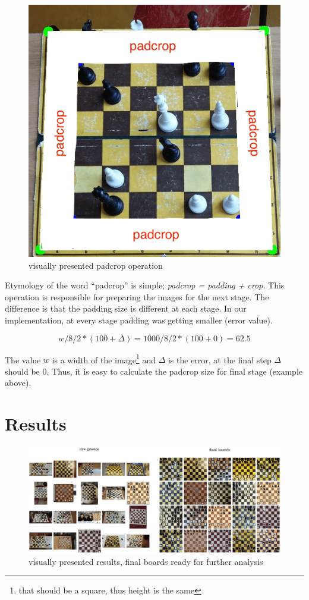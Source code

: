 \documentclass[letterpaper, 12pt]{article}
\begin{document}
\begin{figure}
\centering\vspace*{-0.6in}
\includegraphics[width=\columnwidth]{figure10}
\caption{visually presented padcrop operation}
\end{figure}

Etymology of the word ``padcrop'' is simple; \textit{padcrop = padding + crop}. This operation is responsible for preparing the images for the next stage.
The difference is that the padding size is different at each stage. In our
implementation, at every stage padding was getting smaller (error value).

\[w/8/2 * (100 + \Delta) = 1000/8/2 * (100 + 0) = 62.5\]

The value $w$ is a width of
the image\footnote{that should be a square, thus height is the same} and $\Delta$
is the error, at the final step $\Delta$ should be 0.
Thus, it is easy to calculate the padcrop size for final stage (example above).

\section{Results}

\begin{figure}[H]
\centering
\includegraphics[width=\columnwidth]{figure11}
\caption{visually presented results, final boards ready for further analysis}
\end{figure}
\end{document}
